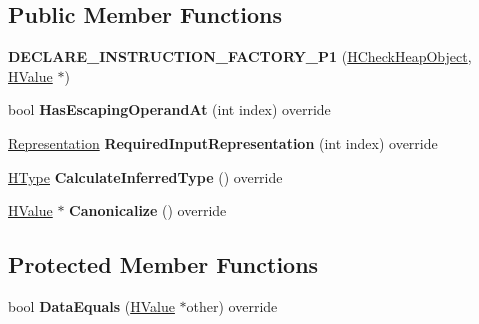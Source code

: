 \subsection*{Public Member Functions}
\begin{DoxyCompactItemize}
\item 
{\bfseries D\+E\+C\+L\+A\+R\+E\+\_\+\+I\+N\+S\+T\+R\+U\+C\+T\+I\+O\+N\+\_\+\+F\+A\+C\+T\+O\+R\+Y\+\_\+\+P1} (\hyperlink{classv8_1_1internal_1_1_h_check_heap_object}{H\+Check\+Heap\+Object}, \hyperlink{classv8_1_1internal_1_1_h_value}{H\+Value} $\ast$)\hypertarget{classv8_1_1internal_1_1_h_check_heap_object_aa1239e5d062122b4e758be1c1702e284}{}\label{classv8_1_1internal_1_1_h_check_heap_object_aa1239e5d062122b4e758be1c1702e284}

\item 
bool {\bfseries Has\+Escaping\+Operand\+At} (int index) override\hypertarget{classv8_1_1internal_1_1_h_check_heap_object_a607083c2a5e913a12c40775c4c588f66}{}\label{classv8_1_1internal_1_1_h_check_heap_object_a607083c2a5e913a12c40775c4c588f66}

\item 
\hyperlink{classv8_1_1internal_1_1_representation}{Representation} {\bfseries Required\+Input\+Representation} (int index) override\hypertarget{classv8_1_1internal_1_1_h_check_heap_object_aae380f8004853c806798f5391fde0607}{}\label{classv8_1_1internal_1_1_h_check_heap_object_aae380f8004853c806798f5391fde0607}

\item 
\hyperlink{classv8_1_1internal_1_1_h_type}{H\+Type} {\bfseries Calculate\+Inferred\+Type} () override\hypertarget{classv8_1_1internal_1_1_h_check_heap_object_a25cd0b157b1f4652c4a7725652703493}{}\label{classv8_1_1internal_1_1_h_check_heap_object_a25cd0b157b1f4652c4a7725652703493}

\item 
\hyperlink{classv8_1_1internal_1_1_h_value}{H\+Value} $\ast$ {\bfseries Canonicalize} () override\hypertarget{classv8_1_1internal_1_1_h_check_heap_object_a44977c5701a30b80c0e510a4836b8c2f}{}\label{classv8_1_1internal_1_1_h_check_heap_object_a44977c5701a30b80c0e510a4836b8c2f}

\end{DoxyCompactItemize}
\subsection*{Protected Member Functions}
\begin{DoxyCompactItemize}
\item 
bool {\bfseries Data\+Equals} (\hyperlink{classv8_1_1internal_1_1_h_value}{H\+Value} $\ast$other) override\hypertarget{classv8_1_1internal_1_1_h_check_heap_object_adee8ebe2adf2b53125f0deef37091e2d}{}\label{classv8_1_1internal_1_1_h_check_heap_object_adee8ebe2adf2b53125f0deef37091e2d}

\end{DoxyCompactItemize}
